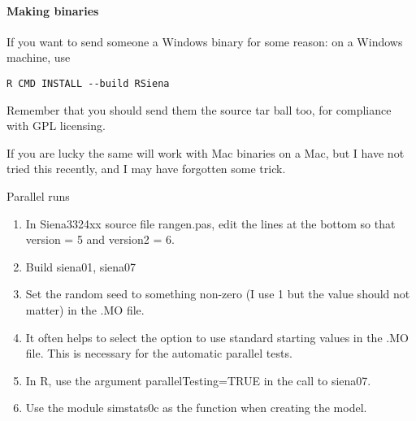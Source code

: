 \documentclass[12pt, a4paper]{article}
\makeatletter
\renewcommand{\=}{\,=\,}
\newcommand{\+}{\,+\,}
\renewcommand{\section}{\@startsection{section}{1}
                {0pt}{\baselineskip}{0.5\baselineskip}
                {\centering\sffamily} }
\makeatother
\begin{document}
\paragraph{Making  binaries}
If you want to send someone a Windows binary for some reason: on a Windows
machine, use 

\verb|R CMD INSTALL --build RSiena|

Remember that you should send them the source tar ball too, for compliance with
GPL licensing.

If you are lucky the same will work with Mac binaries on a Mac, but I have not
tried this recently, and I may have forgotten some trick. 
\section{Parallel runs}
\begin{enumerate}
\item In Siena3324xx source file \textsf{rangen.pas}, edit the lines at the
  bottom so that \textsf{version = 5} and \textsf{version2 = 6}.
\item Build siena01, siena07
\item Set the random seed to something non-zero (I use 1 but the value
  should not matter) in the .MO file.
\item It often helps to select the option to use standard starting values in the
  .MO file. This is necessary for the automatic parallel tests.
\item In R, use the argument \textsf{parallelTesting=TRUE} in the call to
  \textsf{siena07}.
\item Use the module \textsf{simstats0c} as the function when creating the
  model.
\end{enumerate}
\end{document}
